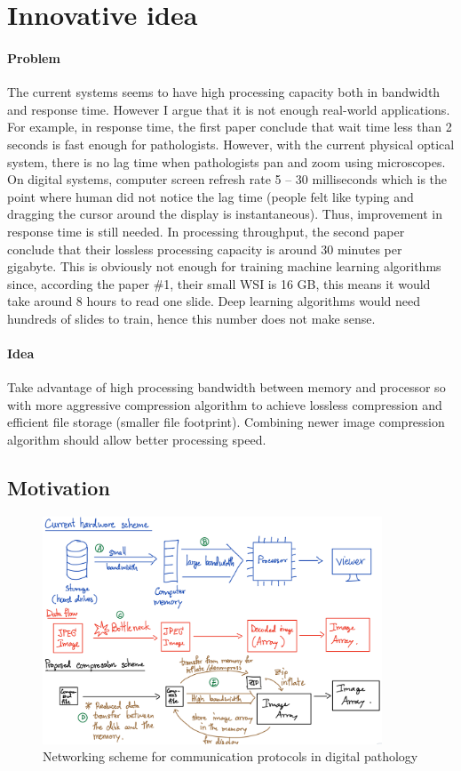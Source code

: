 \documentclass{article}
\begin{document}
\section{Innovative idea}

\paragraph{Problem}
The current systems seems to have high processing capacity both in bandwidth and response time. However I argue that it is not enough real-world applications. For example, in response time, the first paper conclude that wait time less than 2 seconds is fast enough for pathologists. However, with the current physical optical system, there is no lag time when pathologists pan and zoom using microscopes. On digital systems, computer screen refresh rate 5 – 30 milliseconds which is the point where human did not notice the lag time (people felt like typing and dragging the cursor around the display is instantaneous). Thus, improvement in response time is still needed. In processing throughput, the second paper conclude that their lossless processing capacity is around 30 minutes per gigabyte. This is obviously not enough for training machine learning algorithms since, according the paper \#1, their small WSI is 16 GB, this means it would take around 8 hours to read one slide. Deep learning algorithms would need hundreds of slides to train, hence this number does not make sense. 

\paragraph{Idea}
Take advantage of high processing bandwidth between memory and processor so with more aggressive compression algorithm to achieve lossless compression and efficient file storage (smaller file footprint). Combining newer image compression algorithm should allow better processing speed. 

\subsection{Motivation}

\begin{figure}
  \centering
  \includegraphics[width=0.9\textwidth]{proposed-scheme.jpeg}
  \caption{Networking scheme for communication protocols in digital pathology}
  \label{fig:scheme}
\end{figure}
\end{document}

